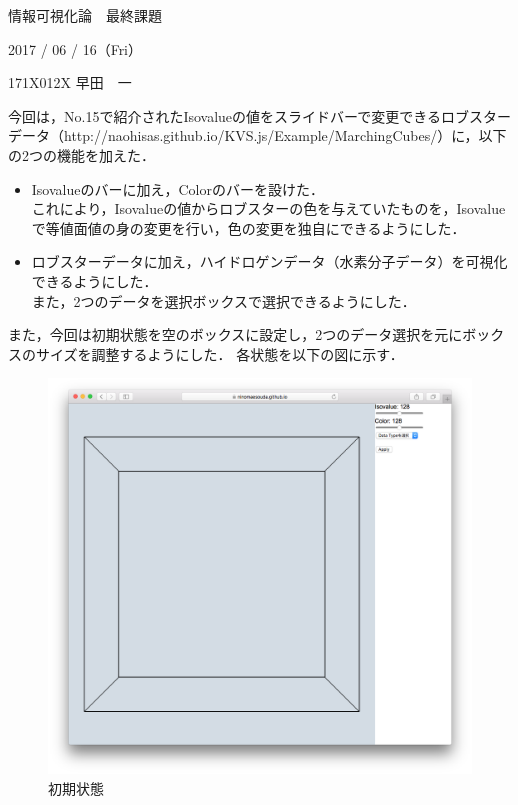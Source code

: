 \documentclass[a4paper]{jsarticle}
\begin{document}
\fontsize{11pt}{20pt}\selectfont

\begin{center}
{\huge 情報可視化論　最終課題}
\end{center}
\begin{flushright}
{\Large 2017 / 06 / 16（Fri）}
\end{flushright}
\begin{flushright}
{\Large 171X012X \hspace{16pt} 早田　一}
\end{flushright}

\par
今回は，No.15で紹介されたIsovalueの値をスライドバーで変更できるロブスターデータ（http://naohisas.github.io/KVS.js/Example/MarchingCubes/）に，以下の2つの機能を加えた．
\begin{itemize}
\item Isovalueのバーに加え，Colorのバーを設けた． \\
これにより，Isovalueの値からロブスターの色を与えていたものを，Isovalueで等値面値の身の変更を行い，色の変更を独自にできるようにした．
\item ロブスターデータに加え，ハイドロゲンデータ（水素分子データ）を可視化できるようにした．\\
また，2つのデータを選択ボックスで選択できるようにした．
\end{itemize}
\par
また，今回は初期状態を空のボックスに設定し，2つのデータ選択を元にボックスのサイズを調整するようにした．
各状態を以下の図に示す．
\vspace{25pt}
\begin{figure}[htbp]
\begin{center}
\includegraphics[scale = 0.18]{vis_first.png}
\\ 初期状態
\end{center}
\end{figure}
\end{document}
